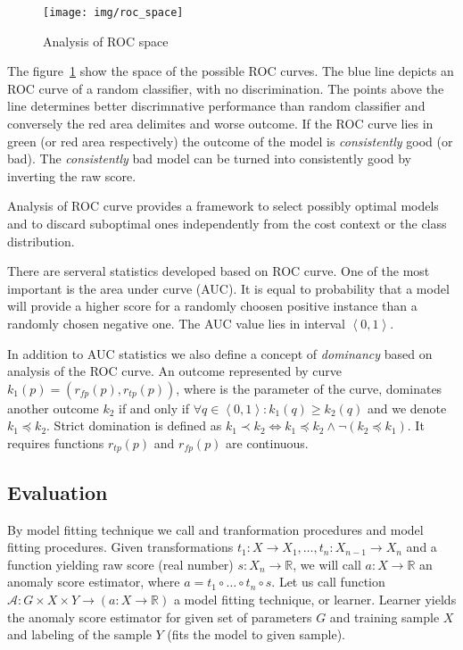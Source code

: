 \begin{figure}[h!]%
  \centering
   \texttt{[image: img/roc\_space]}
  \caption{\small Analysis of ROC space}
  \label{fig:roc_space}
\end{figure}
The figure~\ref{fig:roc_space} show the space of the possible ROC curves.
The blue line depicts an ROC curve of a random classifier, with no discrimination.
The points above the line determines better discrimnative performance than random
classifier and conversely the red area delimites and worse outcome.
If the ROC curve lies in green (or red area respectively) the outcome of the 
model is \emph{consistently} good (or bad). The \emph{consistently} bad model can be
turned into consistently good by inverting the raw score.

Analysis of ROC curve provides a framework to select possibly optimal models and to discard 
suboptimal ones independently from the cost context or the class distribution.

There are serveral statistics developed based on ROC curve. One of the most important is
the area under curve (AUC). It is equal to probability that a model will provide a higher score
for a randomly choosen positive instance than a randomly chosen negative one.
The AUC value lies in interval $\left\langle 0, 1 \right\rangle$.

In addition to AUC statistics we also define a concept of \emph{dominancy} based on analysis
of the ROC curve. An outcome represented by curve 
$k_1\left(p\right) = \left(r_{fp}\left(p\right),r_{tp}\left(p\right)\right)$, where 
is the parameter of the curve, dominates another outcome $k_2$ if and only if 
$\forall q \in \left\langle 0, 1 \right\rangle : k_1\left(q\right) \geq k_2\left(q\right) $ and
we denote $k_1 \preceq k_2$. Strict domination is defined as 
$k_1 \prec k_2 \Leftrightarrow k_1 \preceq k_2 \wedge \neg \left(k_2 \preceq k_1\right)$.
It requires functions $r_{tp}\left(p\right)$ and $r_{fp}\left(p\right)$ are continuous.

\subsection{Evaluation}\label{subsec:eval}

By model fitting technique we call and tranformation procedures and model fitting procedures.
Given transformations $t_1: X \rightarrow X_1,\dots, t_n: X_{n-1} \rightarrow X_n $ and 
a function yielding raw score (real number) $s: X_n \rightarrow \mathbb{R} $, we will call 
$a: X \rightarrow \mathbb{R} $ an anomaly score estimator, where $a = t_1 \circ \dots \circ t_n \circ s$.
Let us call function $\mathcal{A}: G\times X \times Y \rightarrow (a: X \rightarrow \mathbb{R}) $ a model fitting 
technique, or learner. Learner yields the anomaly score estimator for given set of parameters $G$ and
training sample $X$ and labeling of the sample $Y$ (fits the model to given sample).

